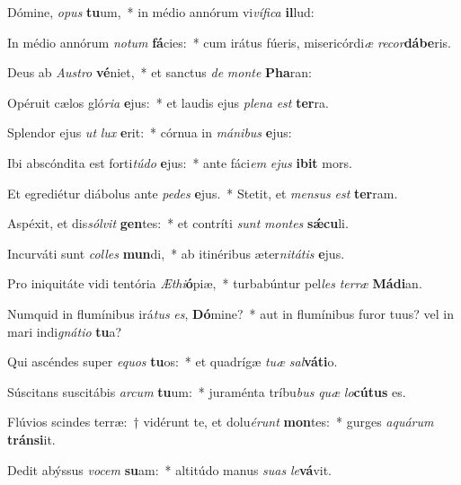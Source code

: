 \item Dómine, \textit{o}\textit{pus} \textbf{tu}um,~* in médio annórum vi\textit{ví}\textit{fi}\textit{ca} \textbf{il}lud:
\item In médio annórum \textit{no}\textit{tum} \textbf{fá}cies:~* cum irátus fúeris, misericórdi\textit{æ} \textit{re}\textit{cor}\textbf{dá}\textbf{be}ris.
\item Deus ab \textit{Aus}\textit{tro} \textbf{vé}niet,~* et sanctus \textit{de} \textit{mon}\textit{te} \textbf{Pha}ran:
\item Opéruit cælos gló\textit{ri}\textit{a} \textbf{e}jus:~* et laudis ejus \textit{ple}\textit{na} \textit{est} \textbf{ter}ra.
\item Splendor ejus \textit{ut} \textit{lux} \textbf{e}rit:~* córnua in \textit{má}\textit{ni}\textit{bus} \textbf{e}jus:
\item Ibi abscóndita est forti\textit{tú}\textit{do} \textbf{e}jus:~* ante fáci\textit{em} \textit{e}\textit{jus} \textbf{i}\textbf{bit} mors.
\item Et egrediétur diábolus ante \textit{pe}\textit{des} \textbf{e}jus.~* Stetit, et \textit{men}\textit{sus} \textit{est} \textbf{ter}ram.
\item Aspéxit, et dis\textit{sól}\textit{vit} \textbf{gen}tes:~* et contríti \textit{sunt} \textit{mon}\textit{tes} \textbf{sǽ}\textbf{cu}li.
\item Incurváti sunt \textit{col}\textit{les} \textbf{mun}di,~* ab itinéribus æter\textit{ni}\textit{tá}\textit{tis} \textbf{e}jus.
\item Pro iniquitáte vidi tentória \textit{Æ}\textit{thi}\textbf{ó}piæ,~* turbabúntur pel\textit{les} \textit{ter}\textit{ræ} \textbf{Má}\textbf{di}an.
\item Numquid in flumínibus irá\textit{tus} \textit{es}, \textbf{Dó}mine?~* aut in flumínibus furor tuus? vel in mari indi\textit{gná}\textit{ti}\textit{o} \textbf{tu}a?
\item Qui ascéndes super \textit{e}\textit{quos} \textbf{tu}os:~* et quadrígæ \textit{tu}\textit{æ} \textit{sal}\textbf{vá}\textbf{ti}o.
\item Súscitans suscitábis \textit{ar}\textit{cum} \textbf{tu}um:~* juraménta tríbu\textit{bus} \textit{quæ} \textit{lo}\textbf{cú}\textbf{tus} es.
\item Flúvios scindes terræ:~† vidérunt te, et dolu\textit{é}\textit{runt} \textbf{mon}tes:~* gurges \textit{a}\textit{quá}\textit{rum} \textbf{tráns}\textbf{i}it.
\item Dedit abýssus \textit{vo}\textit{cem} \textbf{su}am:~* altitúdo manus \textit{su}\textit{as} \textit{le}\textbf{vá}vit.
